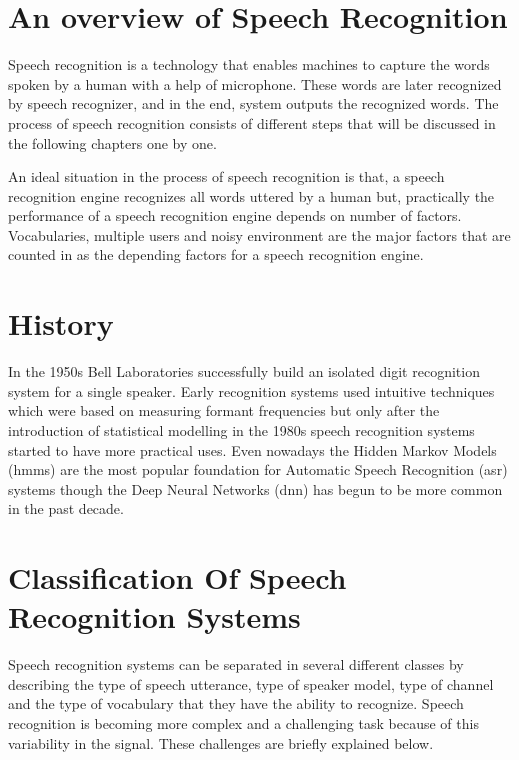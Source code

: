 \documentclass[12pt, a4paper, twoside]{report}
\begin{document}
\section{An overview of Speech Recognition}
Speech recognition is a technology that enables machines to capture the words spoken by a human with a help of microphone. These words are later recognized by speech recognizer, and in the end, system outputs the recognized words. The process of speech recognition consists of different steps that will be discussed in the following chapters one by one.
\par
An ideal situation in the process of speech recognition is that, a speech recognition engine recognizes all words uttered by a human but, practically the performance of a speech recognition engine depends on number of factors. Vocabularies, multiple users and noisy environment are the major factors that are counted in as the depending factors for a speech recognition engine.
\section{History}
In the 1950s Bell Laboratories successfully build an isolated digit recognition system for a single speaker. Early recognition systems used intuitive techniques which were based on measuring formant frequencies but only after the introduction of statistical modelling in the 1980s speech recognition systems started to have more practical uses. Even nowadays the Hidden Markov Models (\acrshort{hmm}s) are the most popular foundation for Automatic Speech Recognition (\acrshort{asr}) systems though the Deep Neural Networks (\acrshort{dnn}) has begun to be more common in the past decade.
\section{Classification Of Speech Recognition Systems}
Speech recognition systems can be separated in several different classes by describing the type of speech utterance, type of speaker model, type of channel and the type of vocabulary that they have the ability to recognize. Speech recognition is becoming more complex and a challenging task because of this variability in the signal. These challenges are briefly explained below.
\end{document}
